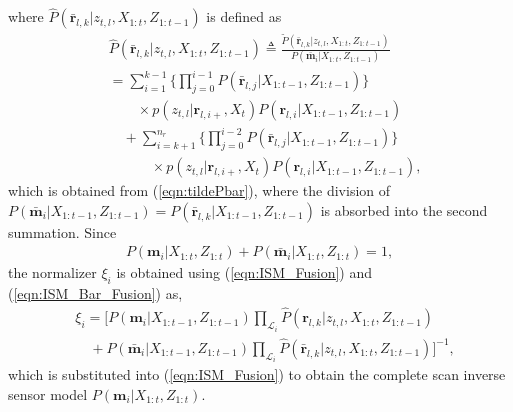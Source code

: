 \documentclass[letterpaper, 10pt, conference]{ieeeconf}
\newcommand{\refeqn}[1]{(\ref{eqn:#1})}
\begin{document}
where $\hat P(\bar{\mathbf{r}}_{l,k}|z_{t,l},X_{1:t},Z_{1:t-1})$ is defined as
\begin{align}
&\hat P(\bar{\mathbf{r}}_{l,k}|z_{t,l},X_{1:t},Z_{1:t-1})
\triangleq\frac{\tilde P(\bar{\mathbf{r}}_{l,k}|z_{t,l},X_{1:t},Z_{1:t-1})}{P(\bar{\mathbf{m}}_i|X_{1:t},Z_{1:t-1})}
\nonumber\\
&=\sum_{i=1}^{k-1}\bigg\{\prod_{j=0}^{i-1}P(\bar{\mathbf{r}}_{l,j}|X_{1:t-1},Z_{1:t-1})\bigg\}\nonumber\\&\quad\quad\times p(z_{t,l}|\mathbf{r}_{l,i+},X_t)P(\mathbf{r}_{l,i}|X_{1:t-1},Z_{1:t-1})
\nonumber
\\
&\quad
+
\sum_{i=k+1}^{n_r}\bigg\{\prod_{j=0}^{i-2}P(\bar{\mathbf{r}}_{l,j}|X_{1:t-1},Z_{1:t-1})\bigg\}\nonumber\\&\quad\qquad\times p(z_{t,l}|\mathbf{r}_{l,i+},X_t)P(\mathbf{r}_{l,i}|X_{1:t-1},Z_{1:t-1}),
\end{align}
which is obtained from \refeqn{tildePbar}, where the division of $P(\bar{\mathbf{m}}_i|X_{1:t-1},Z_{1:t-1})=P(\bar{\mathbf{r}}_{l,k}|X_{1:t-1},Z_{1:t-1})$ is absorbed into the second summation. Since 
\begin{align*}
P(\mathbf{m}_i|X_{1:t},Z_{1:t})+P(\bar{\mathbf{m}}_i|X_{1:t},Z_{1:t})=1,
\end{align*}
the normalizer $\xi_i$ is obtained using \refeqn{ISM_Fusion} and \refeqn{ISM_Bar_Fusion} as,
\begin{align}
&\xi_i=
\bigg[
P(\mathbf{m}_i|{X_{1:t-1}},Z_{1:t-1})
\prod_{\mathcal L_i}
\hat P(\mathbf{r}_{l,k}|z_{t,l},{X_{1:t}},Z_{1:t-1})
\nonumber\\&\quad
+
P(\bar{\mathbf{m}}_i|{X_{1:t-1}},Z_{1:t-1})
\prod_{\mathcal L_i}
\hat P(\bar{\mathbf{r}}_{l,k}|z_{t,l},X_{1:t},Z_{1:t-1})
\bigg]^{-1},\label{eqn:xi}
\end{align}
which is substituted into \refeqn{ISM_Fusion} to obtain the complete scan inverse sensor model $P(\mathbf{m}_i|X_{1:t},Z_{1:t})$.

\end{document}
